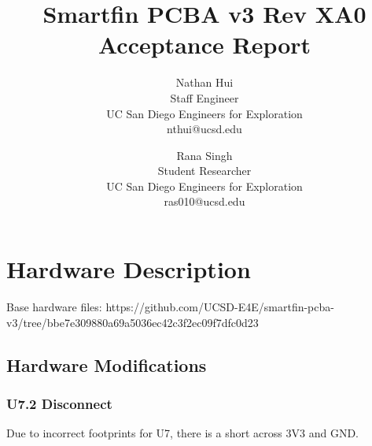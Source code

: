 \documentclass{article}
\title{Smartfin PCBA v3 Rev XA0 Acceptance Report}
\author{Nathan Hui\\Staff Engineer\\UC San Diego Engineers for Exploration\\nthui@ucsd.edu
\and
Rana Singh\\Student Researcher\\UC San Diego Engineers for Exploration\\ras010@ucsd.edu}
\begin{document}
\maketitle
\section{Hardware Description}
Base hardware files: https://github.com/UCSD-E4E/smartfin-pcba-v3/tree/bbe7e309880a69a5036ec42c3f2ec09f7dfc0d23

\subsection{Hardware Modifications}
\subsubsection{U7.2 Disconnect}
Due to incorrect footprints for U7, there is a short across 3V3 and GND.  
\end{document}
